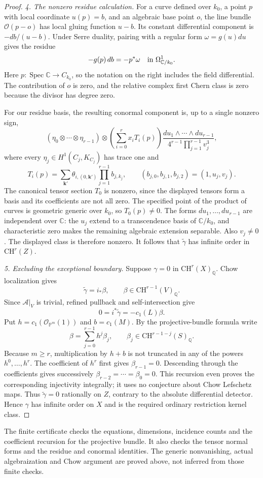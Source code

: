 \begin{proof}
\emph{4. The nonzero residue calculation.}
For a curve defined over $k_0$, a point $p$ with local
coordinate $u(p)=b$, and an algebraic base point $o$,
the line bundle $\mathcal O(p-o)$ has local gluing
function $u-b$. Its constant differential component is
$-db/(u-b)$. Under Serre duality, pairing with a regular
form $\omega=g(u)du$ gives the residue
\[
          -g(p)\,db=-p^*\omega
                        \quad\hbox{in }\Omega^1_{\mathbb C/k_0}.
\]
Here $p:\operatorname{Spec}\mathbb C\to C_{k_0}$,
so the notation on the right includes the field
differential. The contribution of $o$ is zero, and
the relative complex first Chern class is zero because
the divisor has degree zero.

For our residue basis, the resulting conormal component
is, up to a single nonzero sign,
\[
 (\eta_0\otimes\cdots\otimes\eta_{r-1})\otimes
 \left(\sum_{i=0}^{r}x_i T_i(p)\right)
 \frac{du_1\wedge\cdots\wedge du_{r-1}}
                   {4^{r-1}\prod_{j=1}^{r-1}v_j^3},
\]
where every $\eta_j\in H^1(C_j,K_{C_j})$ has trace one and
\[
 T_i(p)=\sum_{\mathbf k'}\theta_{i,(0,\mathbf k')}
                  \prod_{j=1}^{r-1}b_{j,k_j},
       \qquad (b_{j,0},b_{j,1},b_{j,2})=(1,u_j,v_j).
\]
The canonical tensor section $T_0$ is nonzero, since
the displayed tensors form a basis and its coefficients
are not all zero. The specified point of the product
of curves is geometric generic over $k_0$, so $T_0(p)\ne0$.
The forms $du_1,\ldots,du_{r-1}$ are independent over
$\mathbb C$: the $u_j$ extend to a transcendence basis
of $\mathbb C/k_0$, and characteristic zero makes the
remaining algebraic extension separable. Also $v_j\ne0$.
The displayed class is therefore nonzero. It follows
that $\widetilde\gamma$ has infinite order in
$\mathrm{CH}^r(Z)$.

\emph{5. Excluding the exceptional boundary.}
Suppose $\gamma=0$ in $\mathrm{CH}^r(X)_{\mathbb Q}$.
Chow localization gives
\[
               \widetilde\gamma=i_*\beta,
               \qquad\beta\in\mathrm{CH}^{r-1}(V)_{\mathbb Q}.
\]
Since $\mathcal A|_V$ is trivial, refined pullback and
self-intersection give
\[
                  0=i^*\widetilde\gamma=-c_1(L)\beta.
\]
Put $h=c_1(\mathcal O_{\mathbb P^m}(1))$ and
$b=c_1(M)$. By the projective-bundle formula write
\[
                  \beta=\sum_{j=0}^{r-1}h^j\beta_j,
              \qquad\beta_j\in\mathrm{CH}^{r-1-j}(S)_{\mathbb Q}.
\]
Because $m\ge r$, multiplication by $h+b$ is not
truncated in any of the powers $h^0,\ldots,h^r$.
The coefficient of $h^r$ first gives $\beta_{r-1}=0$.
Descending through the coefficients gives successively
$\beta_{r-2}=\cdots=\beta_0=0$. This recursion even
proves the corresponding injectivity integrally; it
uses no conjecture about Chow Lefschetz maps.
Thus $\widetilde\gamma=0$ rationally on $Z$, contrary
to the absolute differential detector. Hence $\gamma$
has infinite order on $X$ and is the required ordinary
restriction kernel class.
\end{proof}

The finite certificate checks the equations, dimensions,
incidence counts and the coefficient recursion for the
projective bundle. It also checks the tensor normal
forms and the residue and conormal identities. The generic
nonvanishing, actual algebraization and Chow argument
are proved above, not inferred from those finite checks.
